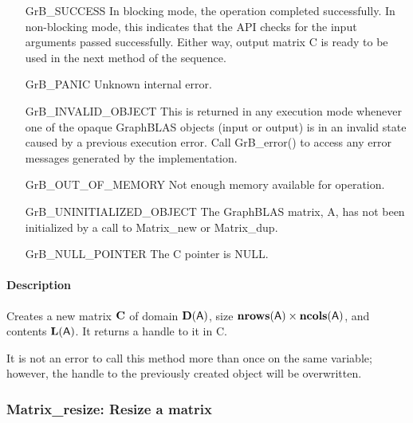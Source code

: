 \begin{itemize}[leftmargin=2.1in]
    \item[{\sf GrB\_SUCCESS}]         In blocking mode, the operation completed
    successfully. In non-blocking mode, this indicates that the API checks 
    for the input arguments passed successfully. Either way, output matrix 
    {\sf C} is ready to be used in the next method of the sequence.

    \item[{\sf GrB\_PANIC}]           Unknown internal error.
    
    \item[{\sf GrB\_INVALID\_OBJECT}] This is returned in any execution mode 
    whenever one of the opaque GraphBLAS objects (input or output) is in an invalid 
    state caused by a previous execution error.  Call {\sf GrB\_error()} to access 
    any error messages generated by the implementation.

    \item[{\sf GrB\_OUT\_OF\_MEMORY}] Not enough memory available for operation.
    
    \item[{\sf GrB\_UNINITIALIZED\_OBJECT}]  The GraphBLAS matrix, {\sf A}, has 
    not been initialized by a call to {\sf Matrix\_new} or {\sf Matrix\_dup}.
    
    \item[{\sf GrB\_NULL\_POINTER}]   The {\sf C} pointer is {\sf NULL}.
\end{itemize}

\paragraph{Description}

Creates a new matrix ${\bf C}$ of domain $\mathbf{D}({\sf A})$, size 
$\mathbf{nrows}({\sf A}) \times \mathbf{ncols}({\sf A})$, and contents 
$\mathbf{L}({\sf A})$. It returns a handle to it in {\sf C}.

It is not an error to call this method more than once on the same variable;  
however, the handle to the previously created object will be overwritten. 

\subsubsection{{\sf Matrix\_resize}: Resize a matrix}

